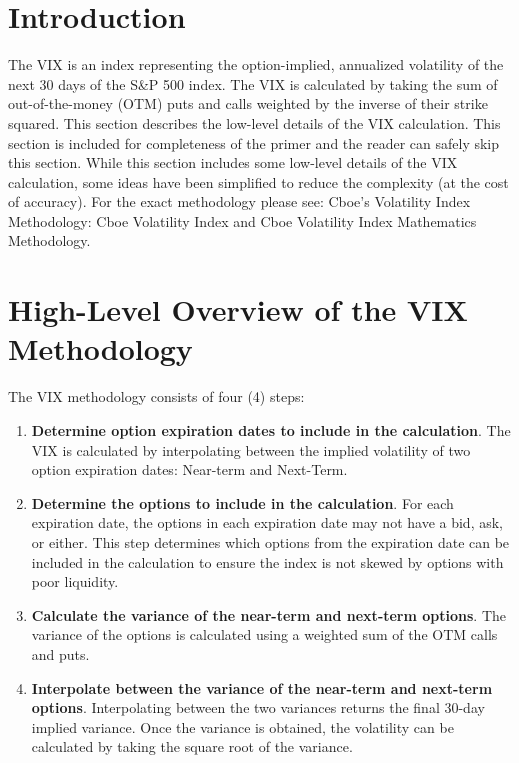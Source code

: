 \documentclass[11pt, oneside]{book}
\begin{document}
\section{Introduction} \label{CalcVix-Intro}
The VIX is an index representing the option-implied, annualized volatility of the next 30 days of the S\&P 500 index. The VIX is calculated by taking the sum of out-of-the-money (OTM) puts and calls weighted by the inverse of their strike squared. This section describes the low-level details of the VIX calculation. This section is included for completeness of the primer and the reader can safely skip this section. While this section includes some low-level details of the VIX calculation, some ideas have been simplified to reduce the complexity (at the cost of accuracy). For the exact methodology please see: Cboe's Volatility Index Methodology: Cboe Volatility Index and Cboe Volatility Index Mathematics Methodology.

\section{High-Level Overview of the VIX Methodology} \label{CalcVix-HighLevel}
The VIX methodology consists of four (4) steps:

\begin{enumerate}
    \item \textbf{Determine option expiration dates to include in the calculation}. The VIX is calculated by interpolating between the implied volatility of two option expiration dates: Near-term and Next-Term. 
    \item \textbf{Determine the options to include in the calculation}. For each expiration date, the options in each expiration date may not have a bid, ask, or either. This step determines which options from the expiration date can be included in the calculation to ensure the index is not skewed by options with poor liquidity.
    \item \textbf{Calculate the variance of the near-term and next-term options}. The variance of the options is calculated using a weighted sum of the OTM calls and puts. 
    \item \textbf{Interpolate between the variance of the near-term and next-term options}. Interpolating between the two variances returns the final 30-day implied variance. Once the variance is obtained, the volatility can be calculated by taking the square root of the variance.
\end{enumerate}
\end{document}
